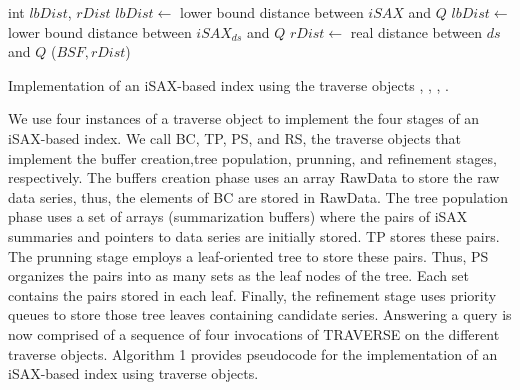 \begin{algorithm}[htbp]
\begin{algorithmic}[1]
    \vspace*{1mm}
        \State int $\mathit{lbDist}$, $\mathit{rDist}$
        \State $\mathit{lbDist} \gets$ lower bound distance between $\mathit{iSAX}$ and $Q$
                \State $\mathit{lbDist} \gets$ lower bound distance between $\mathit{iSAX_{ds}}$ and $Q$
                    \State $\mathit{rDist} \gets$ real distance between $\mathit{ds}$ and $Q$
                        \State *\UpdateBSF($\mathit{BSF},\mathit{rDist}$) 
                    \EndIf
                \EndIf
            \EndFor
            \Return \True
        \Else
            \Return \False
        \EndIf
    \EndProcedure
    
    \end{algorithmic}
    
    \caption{Implementation of an iSAX-based index using the traverse objects \BC, \TP, \PS, \RS.}
    \label{alg:iSAXTraverse}
    \end{algorithm}
    
    

We use four instances of a traverse object to implement the four stages of an iSAX-based
index. We call BC, TP, PS, and RS, the traverse objects that implement the buffer 
creation,tree population, prunning, and refinement stages, respectively.
% 
The buffers creation phase uses an array RawData to store the raw data series, thus, the
elements of BC are stored in RawData. The tree population phase uses a set of arrays
(summarization buffers) where the pairs of iSAX summaries and pointers to data series
are initially stored. TP stores these pairs. The prunning stage employs a leaf-oriented
tree to store these pairs. Thus, PS organizes the pairs into as many sets as the leaf
nodes of the tree. Each set contains the pairs stored in each leaf. Finally, the
refinement stage uses priority queues to store those tree leaves containing candidate
series.
% 
Answering a query is now comprised of a sequence of four invocations of TRAVERSE on the
different traverse objects. Algorithm 1 provides pseudocode for the implementation of
an iSAX-based index using traverse objects.
 
